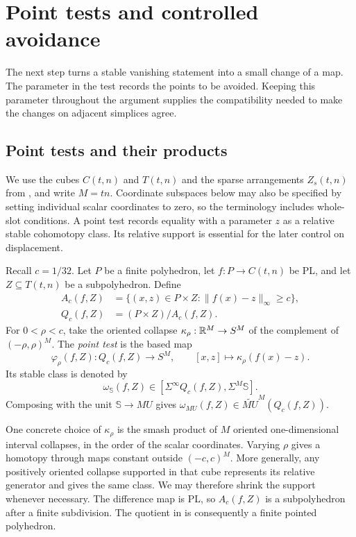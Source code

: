 \section{Point tests and controlled avoidance}
\label{sec:stable-avoidance}

The next step turns a stable vanishing statement into a small change of a
map.  The parameter in the test records the points to be avoided.  Keeping
this parameter throughout the argument supplies the compatibility needed
to make the changes on adjacent simplices agree.

\subsection{Point tests and their products}

We use the cubes $C(t,n)$ and $T(t,n)$ and the sparse arrangements
$Z_s(t,n)$ from , and write $M=tn$.
Coordinate subspaces below may also be specified by setting individual
scalar coordinates to zero, so the terminology includes whole-slot
conditions.  A point test records equality with a parameter $z$ as a
relative stable cohomotopy class.  Its relative support is essential
for the later control on displacement.

\begin{definition}\label{def:point-test}
Recall $c=1/32$.  Let $P$ be a finite polyhedron, let
$f:P\to C(t,n)$ be PL, and let $Z\subseteq T(t,n)$ be a subpolyhedron.
Define
\begin{align*}
 A_c(f,Z)&=\{(x,z)\in P\times Z:\|f(x)-z\|_\infty\ge c\},\\
 Q_c(f,Z)&=(P\times Z)/A_c(f,Z).
\end{align*}
For $0<\rho<c$, take the oriented collapse
$\kappa_\rho:\mathbb R^M\to S^M$ of the complement of
$(-\rho,\rho)^M$.  The \emph{point test} is the based map
\begin{equation}\label{eq:point-test-map}
 \varphi_\rho(f,Z):Q_c(f,Z)\longrightarrow S^M,
 \qquad [x,z]\longmapsto\kappa_\rho(f(x)-z).
\end{equation}
Its stable class is denoted by
\[
 \omega_{\mathbb S}(f,Z)\in
 [\Sigma^\infty Q_c(f,Z),\Sigma^M\mathbb S].
\]
Composing with the unit $\mathbb S\to MU$ gives
$\omega_{MU}(f,Z)\in\widetilde{MU}^{M}(Q_c(f,Z))$.
\end{definition}

One concrete choice of $\kappa_\rho$ is the smash product of $M$ oriented
one-dimensional interval collapses, in the order of the scalar
coordinates.  Varying $\rho$ gives a homotopy through maps constant
outside $(-c,c)^M$.  More generally, any positively oriented collapse
supported in that cube represents its relative generator and gives the
same class.  We may therefore shrink the support whenever necessary.
The difference map is PL, so $A_c(f,Z)$ is a subpolyhedron after a finite
subdivision.  The quotient in  is consequently a
finite pointed polyhedron.

